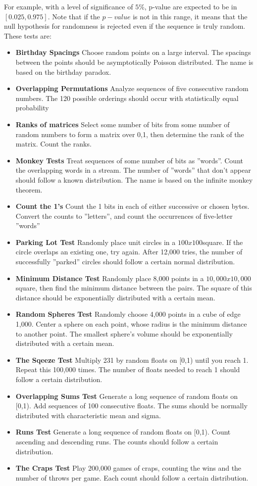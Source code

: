 For example, with a level of significance of $5\%$, p-value are expected to be in
$[0.025, 0.975]$. Note that if the $p-value$ is not in this range, it means that the null
hypothesis for randomness is rejected even if the sequence is truly random. These
tests are:
\begin{itemize}
\item \textbf{Birthday Spacings} Choose random points on a large interval. The spacings
between the points should be asymptotically Poisson distributed. The name
is based on the birthday paradox.
\item \textbf{Overlapping Permutations} Analyze sequences of five consecutive random
numbers. The 120 possible orderings should occur with statistically equal
probability
\item \textbf{Ranks of matrices} Select some number
of bits from some number of random numbers to form a matrix over 0,1, then
determine the rank of the matrix. Count the ranks.
\item \textbf{Monkey Tests} Treat sequences of some number of bits as ''words''. Count
the overlapping words in a stream. The number of ''words'' that don't appear
should follow a known distribution. The name is based on the infinite monkey
theorem.
\item \textbf{Count the 1's} Count the 1 bits in each of either successive
or chosen bytes. Convert the counts to ''letters'', and count the occurrences
of five-letter ''words''
\item \textbf{Parking Lot Test} Randomly place unit circles in a $100 x 100 $square. If the
circle overlaps an existing one, try again. After 12,000 tries, the number of
successfully ''parked'' circles should follow a certain normal distribution.
\item \textbf{Minimum Distance Test} Randomly place 8,000 points in a $10,000 x 10,000$
square, then find the minimum distance between the pairs. The square of this
distance should be exponentially distributed with a certain mean.
\item \textbf{Random Spheres Test} Randomly choose 4,000 points in a cube of edge 1,000.
Center a sphere on each point, whose radius is the minimum distance to another point. The smallest sphere's volume should be exponentially distributed
with a certain mean.
\item \textbf{The Sqeeze Test} Multiply 231 by random floats on [0,1) until you reach 1.
Repeat this 100,000 times. The number of floats needed to reach 1 should
follow a certain distribution.
\item \textbf{Overlapping Sums Test} Generate a long sequence of random floats on [0,1).
Add sequences of 100 consecutive floats. The sums should be normally distributed with characteristic mean and sigma.
\item \textbf{Runs Test} Generate a long sequence of random floats on [0,1). Count ascending and descending runs. The counts should follow a certain distribution.
\item \textbf{The Craps Test} Play 200,000 games of craps, counting the wins and the number
of throws per game. Each count should follow a certain distribution.
\end{itemize}



